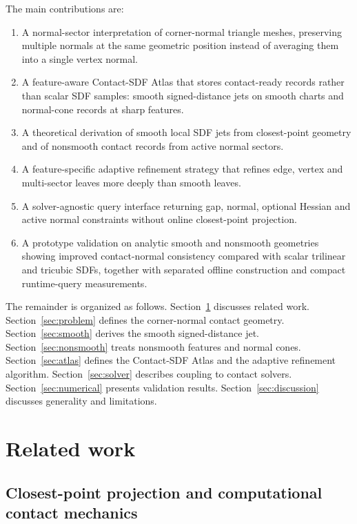 \documentclass[preprint,12pt,sort&compress]{elsarticle}
\begin{document}
The main contributions are:
\begin{enumerate}[label=(\arabic*), leftmargin=1.8em]
\item A normal-sector interpretation of corner-normal triangle meshes, preserving multiple normals at the same geometric position instead of averaging them into a single vertex normal.
\item A feature-aware Contact-SDF Atlas that stores contact-ready records rather than scalar SDF samples: smooth signed-distance jets on smooth charts and normal-cone records at sharp features.
\item A theoretical derivation of smooth local SDF jets from closest-point geometry and of nonsmooth contact records from active normal sectors.
\item A feature-specific adaptive refinement strategy that refines edge, vertex and multi-sector leaves more deeply than smooth leaves.
\item A solver-agnostic query interface returning gap, normal, optional Hessian and active normal constraints without online closest-point projection.
\item A prototype validation on analytic smooth and nonsmooth geometries showing improved contact-normal consistency compared with scalar trilinear and tricubic SDFs, together with separated offline construction and compact runtime-query measurements.
\end{enumerate}

The remainder is organized as follows. Section~\ref{sec:related} discusses related work. Section~\ref{sec:problem} defines the corner-normal contact geometry. Section~\ref{sec:smooth} derives the smooth signed-distance jet. Section~\ref{sec:nonsmooth} treats nonsmooth features and normal cones. Section~\ref{sec:atlas} defines the Contact-SDF Atlas and the adaptive refinement algorithm. Section~\ref{sec:solver} describes coupling to contact solvers. Section~\ref{sec:numerical} presents validation results. Section~\ref{sec:discussion} discusses generality and limitations.

\section{Related work}
\label{sec:related}

\subsection{Closest-point projection and computational contact mechanics}
\end{document}
